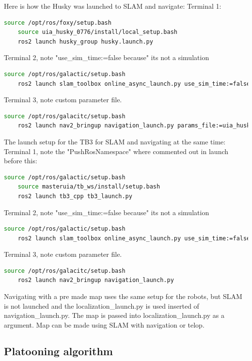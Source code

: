 Here is how the Husky was launched to SLAM and navigate: 
Terminal 1: 
\begin{lstlisting}[language=bash]
    source /opt/ros/foxy/setup.bash
    source uia_husky_0776/install/local_setup.bash
    ros2 launch husky_group husky.launch.py
\end{lstlisting}
Terminal 2, note "use\_sim\_time:=false because" its not a simulation 
\begin{lstlisting}[language=bash]
    source /opt/ros/galactic/setup.bash
    ros2 launch slam_toolbox online_async_launch.py use_sim_time:=false
\end{lstlisting}
Terminal 3, note custom parameter file. 
\begin{lstlisting}[language=bash]
    source /opt/ros/galacitc/setup.bash
    ros2 launch nav2_bringup navigation_launch.py params_file:=uia_husky_0776/husky_group/params/nav2_params.yaml
\end{lstlisting}

The launch setup for the TB3 for SLAM and navigating at the same time: 
Terminal 1, note the "PushRosNamespace" where commented out in launch before this: 
\begin{lstlisting}[language=bash]
    source /opt/ros/galactic/setup.bash
    source masteruia/tb_ws/install/setup.bash
    ros2 launch tb3_cpp tb3_launch.py
\end{lstlisting}
Terminal 2, note "use\_sim\_time:=false because" its not a simulation 
\begin{lstlisting}[language=bash]
    source /opt/ros/galactic/setup.bash
    ros2 launch slam_toolbox online_async_launch.py use_sim_time:=false
\end{lstlisting}
Terminal 3, note custom parameter file. 
\begin{lstlisting}[language=bash]
    source /opt/ros/galacitc/setup.bash
    ros2 launch nav2_bringup navigation_launch.py 
\end{lstlisting}

Navigating with a pre made map uses the same setup for the robots, but SLAM is not launched and the localization\_launch.py is used inserted of navigation\_launch.py. The map is passed into localization\_launch.py as a argument. Map can be made using SLAM with navigation or telop. 

\subsection{Platooning algorithm} \label{Platooning_algorithm}


